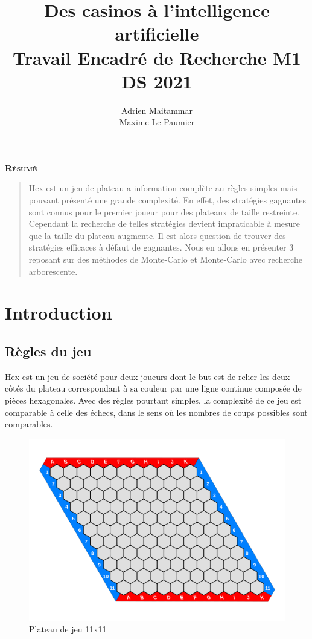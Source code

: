 \documentclass[a4paper]{article}
\title{\huge Des casinos à l'intelligence artificielle\\[15pt] \small Travail Encadré de Recherche M1 DS 2021}
\author{Adrien Maitammar \\ Maxime Le Paumier}
\theoremstyle{definition}
\renewenvironment{abstract}
{
	\centerline
	{\large \bfseries \scshape Résumé}
	\begin{quote}
	}
	{
	\end{quote}
}
\begin{document}
\maketitle

\vspace{40pt}

\begin{abstract}
Hex est un jeu de plateau a information complète au règles simples mais pouvant présenté une grande complexité. En effet, des stratégies gagnantes sont connus pour le premier joueur pour des plateaux de taille restreinte. Cependant la recherche de telles stratégies devient impraticable à mesure que la taille du plateau augmente. Il est alors question de trouver des stratégies efficaces à défaut de gagnantes. Nous en allons en présenter 3 reposant sur des méthodes de Monte-Carlo et Monte-Carlo avec recherche arborescente. 
\end{abstract}
\newpage

\renewcommand{\contentsname}{Sommaire}
\tableofcontents
 \clearpage
 
 
\section{Introduction}

\subsection{Règles du jeu}

Hex est un jeu de société pour deux joueurs dont le but est de relier les deux côtés du plateau correspondant à sa couleur par une ligne continue composée de pièces hexagonales. Avec des règles pourtant simples, la complexité de ce jeu est comparable à celle des échecs, dans le sens où les nombres de coups possibles sont comparables. 

\begin{figure}[h]
	\centering
	\includegraphics[scale=0.13]{11x11.png}
	\caption{Plateau de jeu 11x11}
\end{figure}
\end{document}
